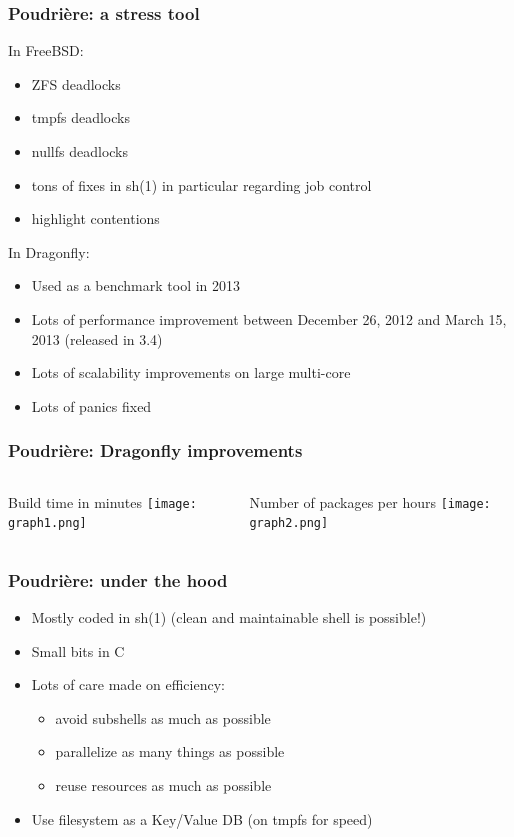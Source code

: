 \begin{frame}
	\frametitle{Poudrière: a stress tool}
	In FreeBSD:
	\begin{itemize}
		\item ZFS deadlocks
		\item tmpfs deadlocks
		\item nullfs deadlocks
		\item tons of fixes in sh(1) in particular regarding job control
		\item highlight contentions
	\end{itemize}
	In Dragonfly:
	\begin{itemize}
		\item Used as a benchmark tool in 2013
		\item Lots of performance improvement between December 26, 2012 and March 15, 2013 (released in 3.4)
		\item Lots of scalability improvements on large multi-core
		\item Lots of panics fixed
	\end{itemize}
\end{frame}

\begin{frame}
	\frametitle{Poudrière: Dragonfly improvements}
	\begin{columns}[T]
		\begin{column}{.48\textwidth}
			Build time in minutes
			\texttt{[image: graph1.png]}
		\end{column}
		\begin{column}{.48\textwidth}
			Number of packages per hours
			\texttt{[image: graph2.png]}
		\end{column}
	\end{columns}
\end{frame}

\begin{frame}
	\frametitle{Poudrière: under the hood}
	\begin{itemize}
			\pause
		\item Mostly coded in sh(1) (clean and maintainable shell is possible!)
			\pause
		\item Small bits in C
			\pause
		\item Lots of care made on efficiency:
			\begin{itemize}
				\item avoid subshells as much as possible
				\item parallelize as many things as possible
				\item reuse resources as much as possible
			\end{itemize}
			\pause
		\item Use filesystem as a Key/Value DB (on tmpfs for speed)
	\end{itemize}
\end{frame}

